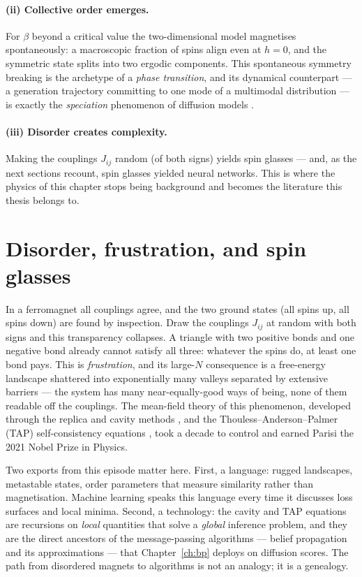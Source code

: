 \paragraph{(ii) Collective order emerges.} For $\beta$ beyond a critical
value the two-dimensional model magnetises spontaneously: a macroscopic
fraction of spins align even at $h = 0$, and the symmetric state splits into
two ergodic components. This spontaneous symmetry breaking is the archetype
of a \emph{phase transition}, and its dynamical counterpart --- a generation
trajectory committing to one mode of a multimodal distribution --- is
exactly the \emph{speciation} phenomenon of diffusion models
\citep{biroli2024dynamical, raya2023spontaneous}.

\paragraph{(iii) Disorder creates complexity.} Making the couplings $J_{ij}$
random (of both signs) yields spin glasses --- and, as the next sections
recount, spin glasses yielded neural networks. This is where the physics of
this chapter stops being background and becomes the literature this thesis
belongs to.

\section{Disorder, frustration, and spin glasses}\label{sec:spinglass}

In a ferromagnet all couplings agree, and the two ground states (all spins
up, all spins down) are found by inspection. Draw the couplings $J_{ij}$ at
random with both signs \citep{edwards1975theory, sherrington1975solvable}
and this transparency collapses. A triangle with two positive bonds and one
negative bond already cannot satisfy all three: whatever the spins do, at
least one bond pays. This is \emph{frustration}, and its large-$N$
consequence is a free-energy landscape shattered into exponentially many
valleys separated by extensive barriers --- the system has many
near-equally-good ways of being, none of them readable off the couplings.
The mean-field theory of this phenomenon, developed through the replica and
cavity methods \citep{mezard1987spin}, and the
Thouless--Anderson--Palmer (TAP) self-consistency equations
\citep{thouless1977solution}, took a decade to control and earned Parisi the
2021 Nobel Prize in Physics.

Two exports from this episode matter here. First, a language: rugged
landscapes, metastable states, order parameters that measure similarity
rather than magnetisation. Machine learning speaks this language every time
it discusses loss surfaces and local minima. Second, a technology: the
cavity and TAP equations are recursions on \emph{local} quantities that
solve a \emph{global} inference problem, and they are the direct ancestors
of the message-passing algorithms --- belief propagation and its
approximations \citep{mezard2009information, zdeborova2016statistical} ---
that Chapter~\ref{ch:bp} deploys on diffusion scores. The path from
disordered magnets to algorithms is not an analogy; it is a genealogy.

